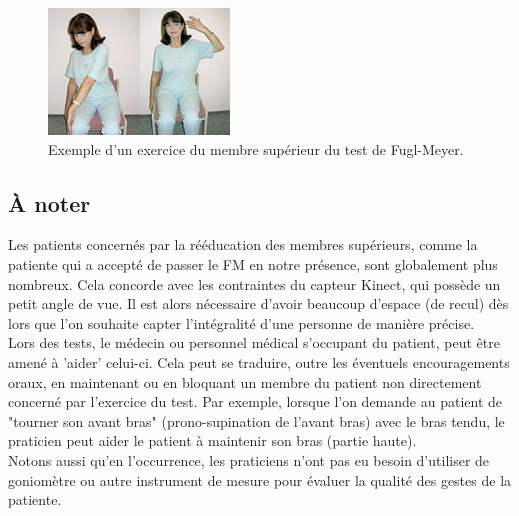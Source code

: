 \begin{figure}[h!]
\centering
\includegraphics[width=0.5\linewidth]{../images/fuglmeyer_example}
\caption{Exemple d'un exercice du membre supérieur du test de Fugl-Meyer.}
\end{figure}

        \subsection{À noter}
Les patients concernés par la rééducation des membres supérieurs, comme la patiente qui a accepté de passer 
le FM en notre présence, sont globalement plus nombreux. Cela concorde avec les contraintes du capteur Kinect, 
qui possède un petit angle de vue. Il est alors nécessaire d'avoir beaucoup d'espace (de recul) dès lors que 
l'on souhaite capter l'intégralité d'une personne de manière précise. \\
Lors des tests, le médecin ou personnel médical s'occupant du patient, peut être amené à 'aider' celui-ci.
Cela peut se traduire, outre les éventuels encouragements oraux, en maintenant ou en bloquant un membre du patient
non directement concerné par l'exercice du test. Par exemple, lorsque l'on demande au patient de "tourner son avant 
bras" (prono-supination de l'avant bras) avec le bras tendu, le praticien peut aider le patient à maintenir son bras
(partie haute).\\
Notons aussi qu'en l'occurrence, les praticiens n'ont pas eu besoin d'utiliser de goniomètre ou autre instrument de 
mesure pour évaluer la qualité des gestes de la patiente.
    
